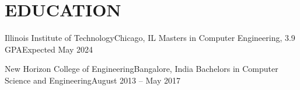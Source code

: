 \section{EDUCATION}
    \resumeSubHeadingListStart

    \resumeSubheading
    {Illinois Institute of Technology}{Chicago, IL}
    {Masters in Computer Engineering}{, 3.9 GPA}{Expected May 2024}
    \resumeItemListStart
    \resumeItemListEnd

    \resumeSubheading
    {New Horizon College of Engineering}{Bangalore, India}
    {Bachelors in Computer Science and Engineering}{}{August 2013 -- May 2017}
    \resumeItemListStart
    \resumeItemListEnd

    \resumeSubHeadingListEnd